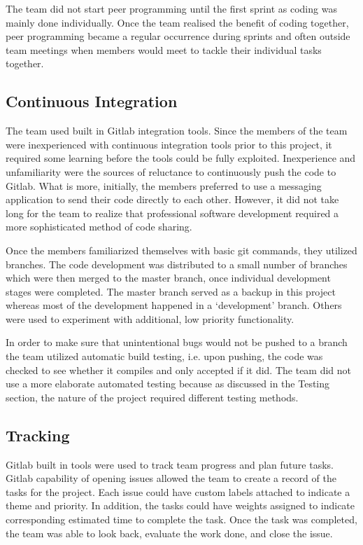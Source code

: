 \documentclass{l3proj}
\begin{document}
The team did not start peer programming until the first sprint as coding was mainly done individually. Once the team realised the benefit of coding together, peer programming became a regular occurrence during sprints and often outside team meetings when members would meet to tackle their individual tasks together.

\subsection{Continuous Integration}
The team used built in Gitlab integration tools. Since the members of the team were inexperienced with continuous integration tools prior to this project, it required some learning before the tools could be fully exploited. Inexperience and unfamiliarity were the sources of reluctance to continuously push the code to Gitlab. What is more, initially, the members preferred to use a messaging application to send their code directly to each other. However, it did not take long for the team to realize that professional software development required a more sophisticated method of code sharing.

Once the members familiarized themselves with basic git commands, they utilized branches. The code development was distributed to a small number of branches which were then merged to the master branch, once individual development stages were completed. The master branch served as a backup in this project whereas most of the development happened in a ‘development' branch. Others were used to experiment with additional, low priority functionality.

In order to make sure that unintentional bugs would not be pushed to a branch the team utilized automatic build testing, i.e. upon pushing, the code was checked to see whether it compiles and only accepted if it did. The team did not use a more elaborate automated testing because as discussed in the Testing section, the nature of the project required different testing methods.

\subsection{Tracking}
Gitlab built in tools were used to track team progress and plan future tasks. Gitlab capability of opening issues allowed the team to create a record of the tasks for the project. Each issue could have custom labels attached to indicate a theme and priority. In addition, the tasks could have weights assigned to indicate corresponding estimated time to complete the task. Once the task was completed, the team was able to look back, evaluate the work done, and close the issue.
\end{document}
